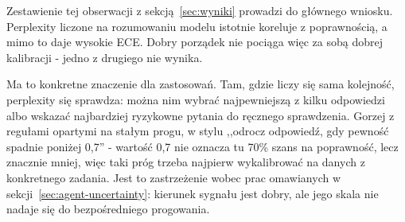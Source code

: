 Zestawienie tej obserwacji z sekcją~\ref{sec:wyniki} prowadzi do
głównego wniosku. Perplexity liczone na rozumowaniu modelu istotnie
koreluje z poprawnością, a mimo to daje wysokie ECE. Dobry porządek
nie pociąga więc za sobą dobrej kalibracji - jedno z drugiego nie
wynika.

Ma to konkretne znaczenie dla zastosowań. Tam, gdzie liczy się
sama kolejność, perplexity się sprawdza: można nim wybrać
najpewniejszą z kilku odpowiedzi albo wskazać najbardziej ryzykowne
pytania do ręcznego sprawdzenia. Gorzej z regułami opartymi na
stałym progu, w stylu ,,odrocz odpowiedź, gdy pewność spadnie
poniżej 0,7'' - wartość 0,7 nie oznacza tu 70\% szans na poprawność,
lecz znacznie mniej, więc taki próg trzeba najpierw wykalibrować
na danych z konkretnego zadania. Jest to zastrzeżenie wobec prac
omawianych w sekcji~\ref{sec:agent-uncertainty}: kierunek sygnału
jest dobry, ale jego skala nie nadaje się do bezpośredniego progowania.
